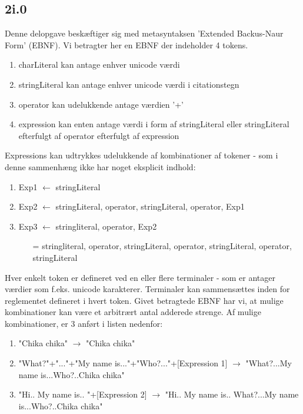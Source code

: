\subsection*{2i.0}
Denne delopgave beskæftiger sig med metasyntaksen 'Extended Backus-Naur Form' (EBNF). Vi betragter her en EBNF der indeholder 4 tokens. 
\begin{enumerate}
\item{charLiteral kan antage enhver unicode værdi}
\item{stringLiteral kan antage enhver unicode værdi i citationstegn}
\item{operator kan udelukkende antage værdien '+'}
\item{expression kan enten antage værdi i form af stringLiteral eller stringLiteral efterfulgt af operator efterfulgt af expression}
\end{enumerate}


Expressions kan udtrykkes udelukkende af kombinationer af tokener - som i denne sammenhæng ikke har noget eksplicit indhold:
\newline
\begin{enumerate}
\item{Exp1 $\leftarrow$ stringLiteral}
\item{Exp2 $\leftarrow$ stringLiteral, operator, stringLiteral, operator, Exp1}
\item{Exp3 $\leftarrow$ stringliteral, operator, Exp2}
\begin{itemize}
\item[=]{stringliteral, operator, stringLiteral, operator, stringLiteral, operator, stringLiteral}
\end{itemize}
\end{enumerate}

Hver enkelt token er defineret ved en eller flere terminaler - som er antager værdier som f.eks. unicode karakterer. Terminaler kan sammensættes inden for reglementet defineret i hvert token. Givet betragtede EBNF har vi, at mulige kombinationer kan være et arbitrært antal adderede strenge. Af mulige kombinationer, er 3 anført i listen nedenfor:
\newline
\begin{enumerate}
\item{"Chika chika" $\rightarrow$ "Chika chika"}
\item{"What?"+"..."+"My name is..."+"Who?..."+[Expression 1] $\rightarrow$ "What?...My name is...Who?..Chika chika"}
\item{"Hi.. My name is.. "+[Expression 2] $\rightarrow$ "Hi.. My name is.. What?...My name is...Who?..Chika chika"}
\end{enumerate}

